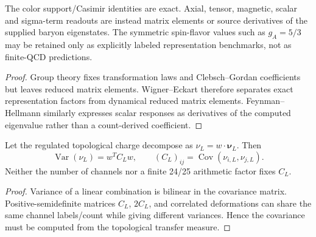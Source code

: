\documentclass[12pt,a4paper]{article}
\begin{document}
\begin{corollary}
\label{p11:cor:primitive-support-and-baryon-matrix-elements}

The color support/Casimir identities are exact.  Axial, tensor, magnetic, scalar and sigma-term readouts are instead matrix elements or source derivatives of the supplied baryon eigenstates.  The symmetric spin-flavor values such as \(g_A=5/3\) may be retained only as explicitly labeled representation benchmarks, not as finite-QCD predictions.
\label{p11:eq:primitive-support-floors-closed}
\label{p11:eq:primitive-axial-tensor-charges}
\label{p11:eq:primitive-baryon-magnetic-moments}
\label{p11:eq:primitive-sigma-term-floor}
\label{p11:eq:primitive-ope-coefficient}
\label{p11:eq:primitive-pion-nucleon-coupling-floor}
\end{corollary}
\begin{proof}

Group theory fixes transformation laws and Clebsch--Gordan coefficients but leaves reduced matrix elements.  Wigner--Eckart therefore separates exact representation factors from dynamical reduced matrix elements.  Feynman--Hellmann similarly expresses scalar responses as derivatives of the computed eigenvalue rather than a count-derived coefficient.
\end{proof}

\begin{theorem}
\label{p11:thm:orthogonal-hurwitz-adjoint-winding-variance}
\label{p11:cor:full-primitive-topological-winding-block}

Let the regulated topological charge decompose as \(\nu_L=w\cdot\boldsymbol\nu_L\).  Then
\[
\operatorname{Var}(\nu_L)=w^TC_Lw,
\qquad (C_L)_{ij}=\operatorname{Cov}(\nu_{i,L},\nu_{j,L}).
\]
Neither the number of channels nor a finite 24/25 arithmetic factor fixes \(C_L\).
\label{p11:eq:derived-topological-enhancement-32}
\label{p11:eq:full-primitive-Xt-closed}
\end{theorem}
\begin{proof}

Variance of a linear combination is bilinear in the covariance matrix.  Positive-semidefinite matrices \(C_L\), \(2C_L\), and correlated deformations can share the same channel labels/count while giving different variances.  Hence the covariance must be computed from the topological transfer measure.
\end{proof}
\end{document}
